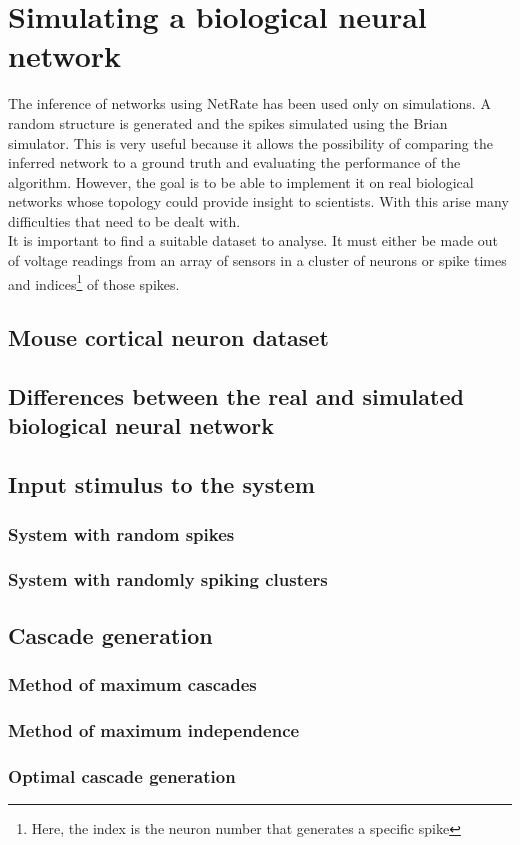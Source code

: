 
\chapter{Simulating a biological neural network}

The inference of networks using NetRate has been used only on simulations. A random structure is generated and the spikes simulated using the Brian simulator. This is very useful because it allows the possibility of comparing the inferred network to a ground truth and evaluating the performance of the algorithm. However, the goal is to be able to implement it on real biological networks whose topology could provide insight to scientists. With this arise many difficulties that need to be dealt with.\\

It is important to find a suitable dataset to analyse. It must either be made out of voltage readings from an array of sensors in a cluster of neurons or spike times and indices\footnote{Here, the index is the neuron number that generates a specific spike} of those spikes. 

\section{Mouse cortical neuron dataset}
\section{Differences between the real and simulated biological neural network}
\section{Input stimulus to the system}
\subsection{System with random spikes}
\subsection{System with randomly spiking clusters}
\section{Cascade generation}
\subsection{Method of maximum cascades}
\subsection{Method of maximum independence}
\subsection{Optimal cascade generation}
